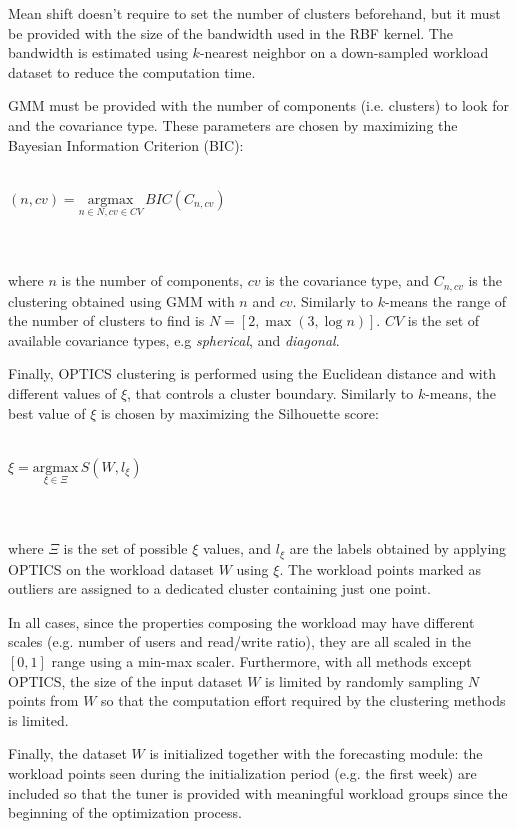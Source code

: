 \documentclass[a4paper, 12pt]{article} %
\begin{document}
	Mean shift doesn't require to set the number of clusters beforehand, but it must be provided with the size of the bandwidth used in the RBF kernel. The bandwidth is estimated using $k$-nearest neighbor on a down-sampled workload dataset to reduce the computation time.
	
	GMM must be provided with the number of components (i.e. clusters) to look for and the covariance type. These parameters are chosen by maximizing the Bayesian Information Criterion (BIC):\\\\
	\centerline{
		$
		(n, cv) = \underset{n \in N, cv \in CV}{\mathrm{argmax}}\, BIC(C_{n, cv})
		$
	}\\\\
	where $n$ is the number of components, $cv$ is the covariance type, and $C_{n, cv}$ is the clustering obtained using GMM with $n$ and $cv$. Similarly to $k$-means the range of the number of clusters to find is $N = [2, \max (3, \log n)]$. $CV$ is the set of available covariance types, e.g \textit{spherical}, and \textit{diagonal}.
	
	Finally, OPTICS clustering is performed using the Euclidean distance and with different values of $\xi$, that controls a cluster boundary. Similarly to $k$-means, the best value of $\xi$ is chosen by maximizing the Silhouette score: \\\\
	\centerline{
		$
		\xi = \underset{\xi \in \Xi}{\mathrm{argmax}}\, S(W, l_\xi)
		$
	}\\\\
	where $\Xi$ is the set of possible $\xi$ values, and $l_\xi$ are the labels obtained by applying OPTICS on the workload dataset $W$ using $\xi$. The workload points marked as outliers are assigned to a dedicated cluster containing just one point.
	
	In all cases, since the properties composing the workload may have different scales (e.g. number of users and read/write ratio), they are all scaled in the $[0, 1]$ range using a min-max scaler.	Furthermore, with all methods except OPTICS, the size of the input dataset $W$ is limited by randomly sampling $N$ points from $W$ so that the computation effort required by the clustering methods is limited.	
	
	Finally, the dataset $W$ is initialized together with the forecasting module: the workload points seen during the initialization period (e.g. the first week) are included so that the tuner is provided with meaningful workload groups since the beginning of the optimization process.
\end{document}

